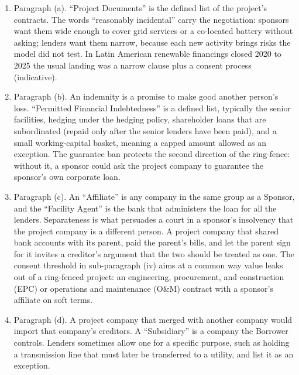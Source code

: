 \begin{enumerate}
\item Paragraph (a). ``Project Documents'' is the defined list of the project's contracts. The words ``reasonably incidental'' carry the negotiation: sponsors want them wide enough to cover grid services or a co-located battery without asking; lenders want them narrow, because each new activity brings risks the model did not test. In Latin American renewable financings closed 2020 to 2025 the usual landing was a narrow clause plus a consent process (indicative).
\item Paragraph (b). An indemnity is a promise to make good another person's loss. ``Permitted Financial Indebtedness'' is a defined list, typically the senior facilities, hedging under the hedging policy, shareholder loans that are subordinated (repaid only after the senior lenders have been paid), and a small working-capital basket, meaning a capped amount allowed as an exception. The guarantee ban protects the second direction of the ring-fence: without it, a sponsor could ask the project company to guarantee the sponsor's own corporate loan.
\item Paragraph (c). An ``Affiliate'' is any company in the same group as a Sponsor, and the ``Facility Agent'' is the bank that administers the loan for all the lenders. Separateness is what persuades a court in a sponsor's insolvency that the project company is a different person. A project company that shared bank accounts with its parent, paid the parent's bills, and let the parent sign for it invites a creditor's argument that the two should be treated as one. The consent threshold in sub-paragraph (iv) aims at a common way value leaks out of a ring-fenced project: an engineering, procurement, and construction (EPC) or operations and maintenance (O\&M) contract with a sponsor's affiliate on soft terms.
\item Paragraph (d). A project company that merged with another company would import that company's creditors. A ``Subsidiary'' is a company the Borrower controls. Lenders sometimes allow one for a specific purpose, such as holding a transmission line that must later be transferred to a utility, and list it as an exception.
\end{enumerate}

